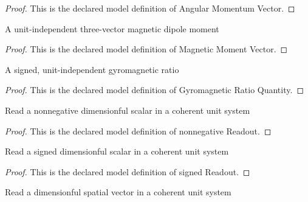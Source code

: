 \begin{proof}
  This is the declared model definition of Angular Momentum Vector.
\end{proof}
\begin{definition}
  \label{def:physics:phyx-mini-0970:phyxminiproblems-problemphyxmini0970-magneticmomentvector}
  A unit-independent three-vector magnetic dipole moment
\end{definition}
\begin{proof}
  This is the declared model definition of Magnetic Moment Vector.
\end{proof}
\begin{definition}
  \label{def:physics:phyx-mini-0970:phyxminiproblems-problemphyxmini0970-gyromagneticratioquantity}
  A signed, unit-independent gyromagnetic ratio
\end{definition}
\begin{proof}
  This is the declared model definition of Gyromagnetic Ratio Quantity.
\end{proof}
\begin{definition}
  \label{def:physics:phyx-mini-0970:phyxminiproblems-problemphyxmini0970-nonnegativereadout}
  Read a nonnegative dimensionful scalar in a coherent unit system
\end{definition}
\begin{proof}
  This is the declared model definition of nonnegative Readout.
\end{proof}
\begin{definition}
  \label{def:physics:phyx-mini-0970:phyxminiproblems-problemphyxmini0970-signedreadout}
  Read a signed dimensionful scalar in a coherent unit system
\end{definition}
\begin{proof}
  This is the declared model definition of signed Readout.
\end{proof}
\begin{definition}
  \label{def:physics:phyx-mini-0970:phyxminiproblems-problemphyxmini0970-vectorreadout}
  Read a dimensionful spatial vector in a coherent unit system
\end{definition}
